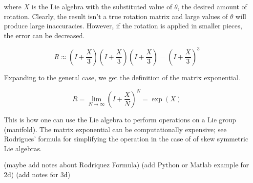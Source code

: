 \documentclass{article}
\begin{document}
  where $X$ is the Lie algebra with the substituted value of $\theta$, the desired amount of rotation. Clearly, the result isn't a true rotation matrix and large values of $\theta$ will produce large inaccuracies. However, if the rotation is applied in smaller pieces, the error can be decreased.

  \begin{equation}
    R \approx \left( I + \frac{X}{3} \right) \left( I + \frac{X}{3} \right) \left( I + \frac{X}{3} \right) = \left( I + \frac{X}{3} \right)^3
  \end{equation}

  Expanding to the general case, we get the definition of the matrix exponential.

  \begin{equation}
    R = \lim_{N\to\infty} \left( I + \frac{X}{N} \right)^N = \exp(X)
  \end{equation}

  This is how one can use the Lie algebra to perform operations on a Lie group (manifold). The matrix exponential can be computationally expensive; see Rodrigues' formula for simplifying the operation in the case of of skew symmetric Lie algebras.

  (maybe add notes about Rodriquez Formula)
  (add Python or Matlab example for 2d)
  (add notes for 3d)


\end{document}
